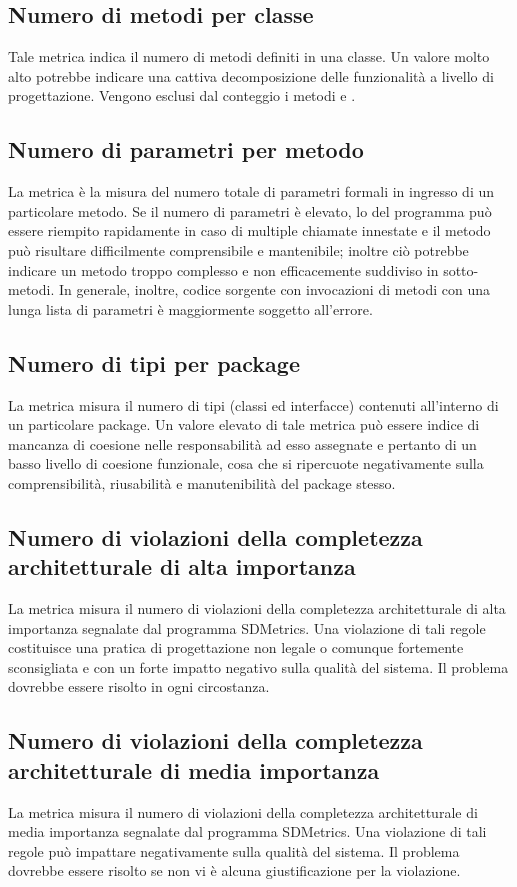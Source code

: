 \subsection{Numero di metodi per classe}
Tale metrica indica il numero di metodi definiti in una classe. Un valore molto alto potrebbe indicare una cattiva decomposizione delle funzionalità a livello di progettazione. Vengono esclusi dal conteggio i metodi \emph{} e \emph{}.


\subsection{Numero di parametri per metodo}
La metrica è la misura del numero totale di parametri formali in ingresso di un particolare metodo. Se il numero di parametri è elevato, lo  del programma può essere riempito rapidamente in caso di multiple chiamate innestate e il metodo può risultare difficilmente comprensibile e mantenibile; inoltre ciò potrebbe indicare un metodo troppo complesso e non efficacemente suddiviso in sotto-metodi. In generale, inoltre, codice sorgente con invocazioni di metodi con una lunga lista di parametri è maggiormente soggetto all'errore.


\subsection{Numero di tipi per package}
La metrica misura il numero di tipi (classi ed interfacce) contenuti all'interno di un particolare package. Un valore elevato di tale metrica può essere indice di mancanza di coesione nelle responsabilità ad esso assegnate e pertanto di un basso livello di coesione funzionale, cosa che si ripercuote negativamente sulla comprensibilità, riusabilità e manutenibilità del package stesso. 


\subsection{Numero di violazioni della completezza architetturale di alta importanza}
La metrica misura il numero di violazioni della completezza architetturale di alta importanza segnalate dal programma SDMetrics. Una violazione di tali regole costituisce una pratica di progettazione non legale o comunque fortemente sconsigliata e con un forte impatto negativo sulla qualità del sistema. Il problema dovrebbe essere risolto in ogni circostanza.


\subsection{Numero di violazioni della completezza architetturale di media importanza}
La metrica misura il numero di violazioni della completezza architetturale di media importanza segnalate dal programma SDMetrics. Una violazione di tali regole può impattare negativamente sulla qualità del sistema. Il problema dovrebbe essere risolto se non vi è alcuna giustificazione per la violazione.


